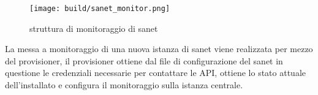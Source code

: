 \begin{figure}[H]
    \centering
    \texttt{[image: build/sanet\_monitor.png]}
    \caption{struttura di monitoraggio di sanet}
    \label{fig:enter-label}
\end{figure}

La messa a monitoraggio di una nuova istanza di sanet viene realizzata per mezzo del provisioner, il provisioner ottiene dal file di configurazione del sanet in questione le credenziali necessarie per contattare le API, ottiene lo stato attuale dell'installato e configura il monitoraggio sulla istanza centrale.



